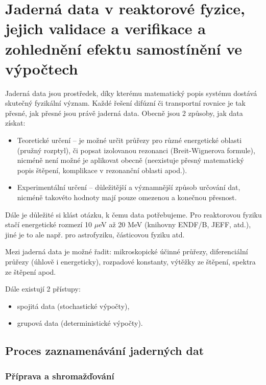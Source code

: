 \section[Jaderná data]{Jaderná data v reaktorové fyzice, jejich validace a verifikace a zohlednění efektu samostínění ve výpočtech}

Jaderná data jsou prostředek, díky kterému matematický popis systému dostává skutečný fyzikální význam. Každé řešení difúzní či transportní rovnice je tak přesné, jak přesné jsou právě jaderná data. Obecně jsou 2 způsoby, jak data získat:

\begin{itemize}
  \item Teoretické určení -- je možné určit průřezy pro různé energetické oblasti (pružný rozptyl), či popsat izolovanou rezonanci (Breit-Wignerova formule), nicméně není možné je aplikovat obecně (neexistuje přesný matematický popis štěpení, komplikace v rezonanční oblasti apod.).
  \item Experimentální určení -- důležitější a významnější způsob určování dat, nicméně takovéto hodnoty mají pouze omezenou a konečnou přesnost.
\end{itemize}

Dále je důležité si klást otázku, k čemu data potřebujeme. Pro reaktorovou fyziku stačí energetické rozmezí 10 $\mu$eV až 20 MeV (knihovny ENDF/B, JEFF, atd.), jiné je to ale např. pro astrofyziku, částicovou fyziku atd.

Mezi jaderná data je možné řadit: mikroskopické účinné průřezy, diferenciální průřezy (úhlově i energeticky), rozpadové konstanty, výtěžky ze štěpení, spektra ze štěpení apod.

Dále existují 2 přístupy:

\begin{itemize}
  \item spojitá data (stochastické výpočty),
  \item grupová data (deterministické výpočty).
\end{itemize}

\subsection{Proces zaznamenávání jaderných dat}

\subsubsection{Příprava a shromažďování}


